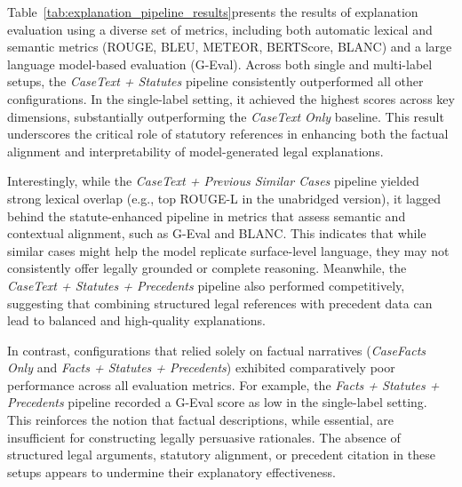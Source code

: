Table~\ref{tab:explanation_pipeline_results}presents the results of explanation evaluation using a diverse set of metrics, including both automatic lexical and semantic metrics (ROUGE, BLEU, METEOR, BERTScore, BLANC) and a large language model-based evaluation (G-Eval). Across both single and multi-label setups, the \textit{CaseText + Statutes} pipeline consistently outperformed all other configurations. In the single-label setting, it achieved the highest scores across key dimensions, substantially outperforming the \textit{CaseText Only} baseline. This result underscores the critical role of statutory references in enhancing both the factual alignment and interpretability of model-generated legal explanations.

Interestingly, while the \textit{CaseText + Previous Similar Cases} pipeline yielded strong lexical overlap (e.g., top ROUGE-L in the unabridged version), it lagged behind the statute-enhanced pipeline in metrics that assess semantic and contextual alignment, such as G-Eval and BLANC. This indicates that while similar cases might help the model replicate surface-level language, they may not consistently offer legally grounded or complete reasoning. Meanwhile, the \textit{CaseText + Statutes + Precedents} pipeline also performed competitively, suggesting that combining structured legal references with precedent data can lead to balanced and high-quality explanations.

In contrast, configurations that relied solely on factual narratives (\textit{CaseFacts Only} and \textit{Facts + Statutes + Precedents}) exhibited comparatively poor performance across all evaluation metrics. For example, the \textit{Facts + Statutes + Precedents} pipeline recorded a G-Eval score as low in the single-label setting. This reinforces the notion that factual descriptions, while essential, are insufficient for constructing legally persuasive rationales. The absence of structured legal arguments, statutory alignment, or precedent citation in these setups appears to undermine their explanatory effectiveness.

